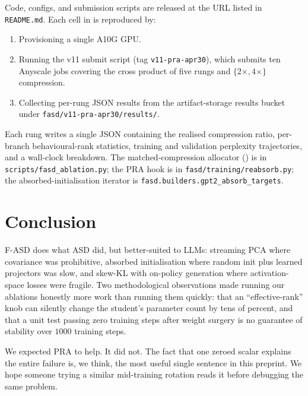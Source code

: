 \documentclass[11pt]{article}
\newcommand{\fasd}{\textsc{F-ASD}}
\newcommand{\asd}{\textsc{ASD}}
\newcommand{\pra}{\textsc{PRA}}
\begin{document}
{\sloppy
Code, configs, and submission scripts are released at the URL listed in
\texttt{README.md}. Each cell in  is reproduced by:
\begin{enumerate}[leftmargin=*,nosep]
  \item Provisioning a single A10G GPU.
  \item Running the v11 submit script (tag \texttt{v11-pra-apr30}),
        which submits ten Anyscale jobs covering the cross product of
        five rungs and $\{2\times, 4\times\}$ compression.
  \item Collecting per-rung JSON results from the artifact-storage
        results bucket under
        \texttt{fasd/v11-pra-apr30/results/}.
\end{enumerate}
Each rung writes a single JSON containing the realised compression
ratio, per-branch behavioural-rank statistics, training and validation
perplexity trajectories, and a wall-clock breakdown. The
matched-compression allocator () is in
\texttt{scripts/fasd\_ablation.py}; the \pra{} hook is in
\texttt{fasd/training/reabsorb.py}; the absorbed-initialisation
iterator is \texttt{fasd.builders.gpt2\_absorb\_targets}.
\par}

\section{Conclusion}

\fasd{} does what \asd{} did, but better-suited to LLMs: streaming PCA
where covariance was prohibitive, absorbed initialisation where random
init plus learned projectors was slow, and skew-KL with on-policy
generation where activation-space losses were fragile. Two
methodological observations made running our ablations honestly more
work than running them quickly: that an ``effective-rank'' knob can
silently change the student's parameter count by tens of percent, and
that a unit test passing zero training steps after weight surgery is no
guarantee of stability over $1000$ training steps.

We expected \pra{} to help. It did not. The fact that one zeroed scalar
explains the entire failure is, we think, the most useful single
sentence in this preprint. We hope someone trying a similar
mid-training rotation reads it before debugging the same problem.
\end{document}
